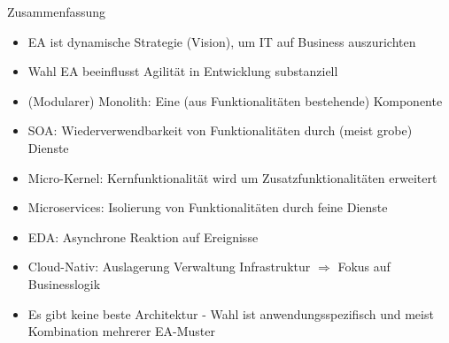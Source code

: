 \begin{frame}{Zusammenfassung}
    \begin{itemize}
        \item EA ist dynamische Strategie (Vision), um IT auf Business auszurichten
        \item Wahl EA beeinflusst Agilität in Entwicklung substanziell
        \item (Modularer) Monolith: Eine (aus Funktionalitäten bestehende) Komponente
        \item SOA: Wiederverwendbarkeit von Funktionalitäten durch (meist grobe) Dienste
        \item Micro-Kernel: Kernfunktionalität wird um Zusatzfunktionalitäten erweitert
        \item Microservices: Isolierung von Funktionalitäten durch feine Dienste
        \item EDA: Asynchrone Reaktion auf Ereignisse
        \item Cloud-Nativ: Auslagerung Verwaltung Infrastruktur $\Rightarrow$ Fokus auf Businesslogik
        \item Es gibt keine beste Architektur - Wahl ist anwendungsspezifisch und meist Kombination mehrerer EA-Muster
    \end{itemize}
\end{frame}
